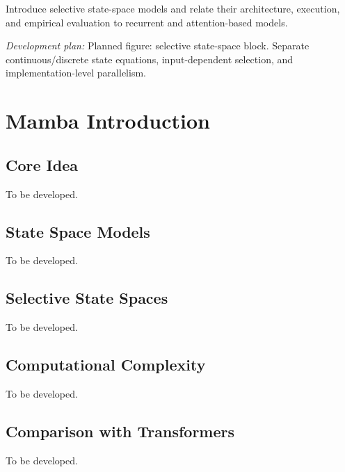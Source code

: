 \documentclass[11pt, oneside]{book}
\let\originalsection\section
\renewcommand{\section}{\Needspace{7\baselineskip}\originalsection}
\let\originalsubsection\subsection
\renewcommand{\subsection}{\Needspace{6\baselineskip}\originalsubsection}
\begin{document}
Introduce selective state-space models and relate their architecture, execution, and empirical evaluation to recurrent and attention-based models.

\textit{Development plan:} Planned figure: selective state-space block. Separate continuous/discrete state equations, input-dependent selection, and implementation-level parallelism.

\section{Mamba Introduction}\label{sec:source-7-1}

\subsection{Core Idea}\label{sec:source-7-1-1}
{\small\color{gray!70!black} To be developed.}

\subsection{State Space Models}\label{sec:source-7-1-2}
{\small\color{gray!70!black} To be developed.}

\subsection{Selective State Spaces}\label{sec:source-7-1-3}
{\small\color{gray!70!black} To be developed.}

\subsection{Computational Complexity}\label{sec:source-7-1-4}
{\small\color{gray!70!black} To be developed.}

\subsection{Comparison with Transformers}\label{sec:source-7-1-5}
{\small\color{gray!70!black} To be developed.}
\end{document}
